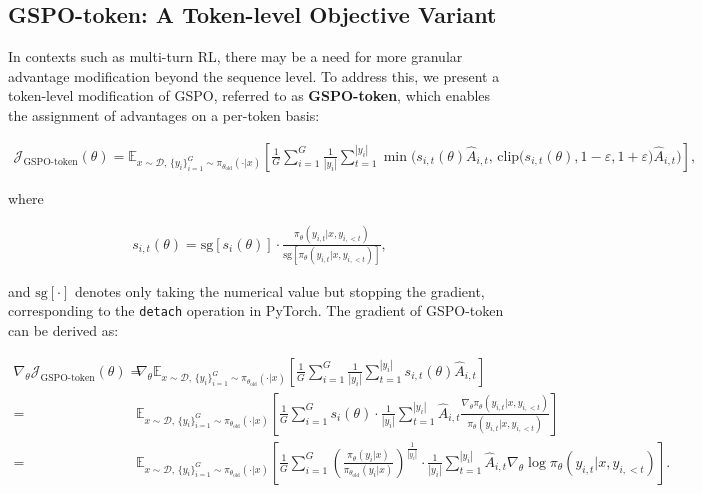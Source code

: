\subsection{GSPO-token: A Token-level Objective Variant}

In contexts such as multi-turn RL, there may be a need for more granular advantage modification beyond the sequence level. To address this, we present a token-level modification of GSPO, referred to as \textbf{GSPO-token}, which enables the assignment of advantages on a per-token basis:

\begin{align}
\mathcal{J}_\text{GSPO-token}(\theta)
=
\mathbb{E}_{ x \sim \mathcal{D},\, \{y_i\}_{i=1}^G \sim \pi_{\theta_\text{old}}( \cdot | x) }
\left[
\frac{1}{G} \sum_{i=1}^G \frac{1}{|y_i|} \sum_{t=1}^{|y_i|}
\min\Bigg(
s_{i,t}(\theta) \widehat{A}_{i,t},\,
\mathrm{clip}\big(s_{i,t}(\theta), 1 - {\varepsilon}, 1 + {\varepsilon}\big) \widehat{A}_{i,t}
\Bigg)
\right],
\label{equ:gspo-token}
\end{align}

where

\begin{align}
s_{i,t}(\theta) 
= \mathrm{sg} \left[ s_{i}(\theta) \right]  \cdot \frac{ \pi_{\theta} (y_{i,t} | x, y_{i,<t}) }{ \mathrm{sg} \left[ \pi_{\theta} (y_{i,t} | x, y_{i,<t}) \right] },
\end{align}

and $\mathrm{sg}[\cdot]$ denotes only taking the numerical value but stopping the gradient, corresponding to the \texttt{detach} operation in PyTorch. The gradient of GSPO-token can be derived as:

\begin{align}
\nabla_{\theta} \mathcal{J}_\text{GSPO-token}(\theta)
=&\ 
\nabla_{\theta} \mathbb{E}_{ x \sim \mathcal{D},\, \{y_i\}_{i=1}^G \sim \pi_{\theta_\text{old}}( \cdot | x) }
\left[ 
\frac{1}{G} \sum_{i=1}^{G}
\frac{1}{|y_i|} \sum_{t=1}^{|y_i|} 
s_{i,t}(\theta) \widehat{A}_{i,t}
\right] \\
=&\ 
\mathbb{E}_{ x \sim \mathcal{D},\, \{y_i\}_{i=1}^G \sim \pi_{\theta_\text{old}}( \cdot | x) }
\left[
\frac{1}{G} \sum_{i=1}^{G} s_i (\theta) \cdot \frac{1}{|y_i|} \sum_{t=1}^{|y_i|} 
\widehat{A}_{i,t} \frac{ \nabla_{\theta} \pi_{\theta} (y_{i,t} | x, y_{i,<t}) }{ \pi_{\theta} (y_{i,t} | x, y_{i,<t}) }
\right] \\
=&\ 
\mathbb{E}_{ x \sim \mathcal{D},\, \{y_i\}_{i=1}^G \sim \pi_{\theta_\text{old}}( \cdot | x) }
\left[ 
\frac{1}{G} \sum_{i=1}^{G}  \left( \frac{ \pi_{\theta} (y_i | x) }{ \pi_{\theta_\text{old}} (y_i | x)} \right)^{\frac{1}{|y_i|}}
\cdot \frac{1}{|y_i|} \sum_{t=1}^{|y_i|}
\widehat{A}_{i,t} \nabla_{\theta} \log \pi_{\theta} (y_{i,t} | x, y_{i,<t})  
\right].
\label{equ:gspo-token_grad}
\end{align}

